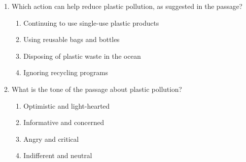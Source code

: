 \documentclass[12pt]{article}
\begin{document}
\begin{enumerate}
    \vspace{0.5cm}

    \item Which action can help reduce plastic pollution, as suggested in the passage?
    \begin{enumerate}[label=\Alph*.]
        \item Continuing to use single-use plastic products
        \item Using reusable bags and bottles
        \item Disposing of plastic waste in the ocean
        \item Ignoring recycling programs
    \end{enumerate}

    \vspace{0.5cm}

    \item What is the tone of the passage about plastic pollution?
    \begin{enumerate}[label=\Alph*.]
        \item Optimistic and light-hearted
        \item Informative and concerned
        \item Angry and critical
        \item Indifferent and neutral
    \end{enumerate}

\end{enumerate}
\end{document}
